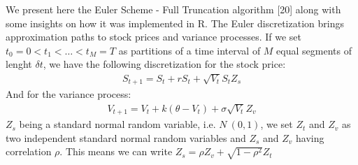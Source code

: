 \documentclass[12pt,twoside]{reedthesis}
\theoremstyle{definition}
\theoremstyle{definition}
\theoremstyle{remark}
\begin{document}
  We present here the Euler Scheme - Full Truncation algorithm {[}20{]}
  along with some insights on how it was implemented in R. The Euler
  discretization brings approximation paths to stock prices and variance
  processes. If we set \(t_0 = 0 < t_1 < \dots < t_M = T\) as partitions
  of a time interval of \(M\) equal segments of lenght \(\delta t\), we
  have the following discretization for the stock price:
  \begin{align}
  S_{t+1} = S_t + rS_t + \sqrt{V_t} S_t Z_s
  \end{align}
  \noindent
  And for the variance process:
  \begin{align}
  V_{t+1} = V_t + k (\theta - V_t) + \sigma \sqrt{V_t} Z_v
  \end{align}
  \noindent
  \(Z_s\) being a standard normal random variable, i.e. \(N~(0,1)\), we
  set \(Z_t\) and \(Z_v\) as two independent standard normal random
  variables and \(Z_s\) and \(Z_v\) having correlation \(\rho\). This
  means we can write \(Z_s = \rho Z_v + \sqrt{1-\rho^2} Z_t\)
  
\end{document}
